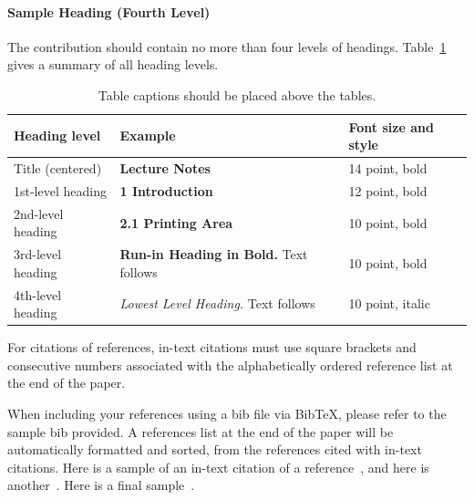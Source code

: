 \documentclass[runningheads]{llncs}
\begin{document}
	\paragraph{Sample Heading (Fourth Level)}
	The contribution should contain no more than four levels of
	headings. Table~\ref{tab1} gives a summary of all heading levels.
	
	\begin{table}[t]
		\caption{Table captions should be placed above the
			tables.}\label{tab1}
		\begin{tabular}{|l|l|l|}
			\hline
			Heading level &  Example & Font size and style\\
			\hline
			Title (centered) &  {\Large\bfseries Lecture Notes} & 14 point, bold\\
			1st-level heading &  {\large\bfseries 1 Introduction} & 12 point, bold\\
			2nd-level heading & {\bfseries 2.1 Printing Area} & 10 point, bold\\
			3rd-level heading & {\bfseries Run-in Heading in Bold.} Text follows & 10 point, bold\\
			4th-level heading & {\itshape Lowest Level Heading.} Text follows & 10 point, italic\\
			\hline
		\end{tabular}
	\end{table}
	
	For citations of references, in-text citations must use square brackets
	and consecutive numbers associated with the alphabetically ordered
	reference list at the end of the paper.
	
	When including your references using a bib file via BibTeX, please refer to
	the sample bib provided. A references list at the end of the paper will be
	automatically formatted and sorted, from the references cited with in-text 
	citations. Here is a sample of an in-text citation of a reference~\cite{sample1}, 
	and here is another~\cite{sample2}. 
	Here is a final sample~\cite{sample3,sample4,sample5}.
	
\end{document}
